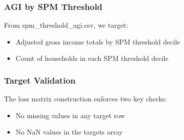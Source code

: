 \subsubsection{AGI by SPM Threshold}

From spm\_threshold\_agi.csv, we target:
\begin{itemize}
    \item Adjusted gross income totals by SPM threshold decile
    \item Count of households in each SPM threshold decile
\end{itemize}

\subsubsection{Target Validation}

The loss matrix construction enforces two key checks:
\begin{itemize}
    \item No missing values in any target row
    \item No NaN values in the targets array
\end{itemize}